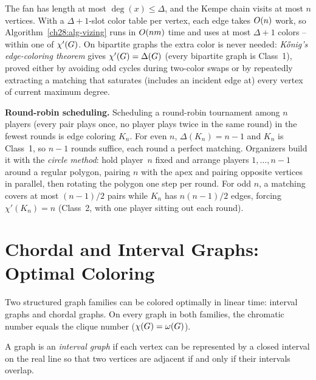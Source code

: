 \begin{complexitybox}
The fan has length at most $\deg(x)\le\Delta$, and the Kempe chain visits at most $n$ vertices.
With a $\Delta+1$-slot color table per vertex, each edge takes $O(n)$ work, so Algorithm~\ref{ch28:alg-vizing} runs in $O(nm)$ time
and uses at most $\Delta+1$ colors -- within one of $\chi'(G)$. On
bipartite graphs the extra color is never needed: \emph{K\H{o}nig's edge-coloring theorem} gives
$\chi'(G)=\Delta(G)$ (every bipartite graph is Class~1), proved either by avoiding odd cycles during two-color swaps or by repeatedly extracting a matching that saturates (includes an incident edge at) every vertex of current maximum degree.
\end{complexitybox}

\begin{applicationbox}
\textbf{Round-robin scheduling.} Scheduling a round-robin tournament among $n$ players (every
pair plays once, no player plays twice in the same round) in the fewest rounds is edge
coloring $K_n$. For even $n$, $\Delta(K_n)=n-1$ and $K_n$ is Class~1, so $n-1$ rounds
suffice, each round a perfect matching. Organizers build it with the \emph{circle method}: hold player~$n$ fixed and arrange players $1,\dots,n-1$ around a regular polygon, pairing $n$ with the apex and pairing opposite vertices in parallel, then rotating the polygon one step per round. For odd $n$, a matching covers at most $(n-1)/2$ pairs while $K_n$ has $n(n-1)/2$ edges, forcing $\chi'(K_n)=n$ (Class~2, with one player sitting out each round).
\end{applicationbox}

\section{Chordal and Interval Graphs: Optimal Coloring}
\label{ch28:chordal}

Two structured graph families can be colored optimally in
linear time: interval graphs and chordal graphs. On every graph in both families, the chromatic number equals the clique number ($\chi(G)=\omega(G)$).

\begin{definition}
\label{ch28:def-interval}
A graph is an \emph{interval graph} if each vertex can be represented by a closed
interval on the real line so that two vertices are adjacent if and only if their
intervals overlap.
\end{definition}

